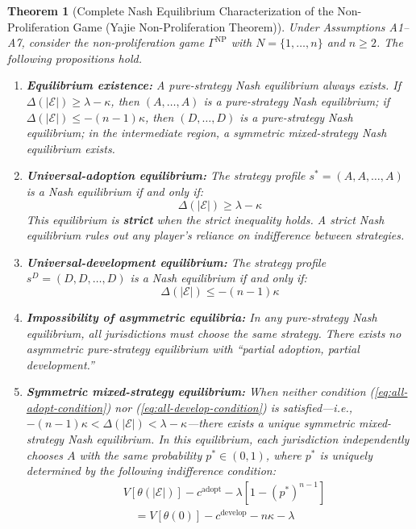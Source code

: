 \documentclass[12pt,a4paper]{article}
\newtheorem{theorem}{Theorem}[section]
\theoremstyle{definition}
\theoremstyle{remark}
\begin{document}
\begin{theorem}[Complete Nash Equilibrium Characterization of the Non-Proliferation Game (Yajie Non-Proliferation Theorem)]
\label{thm:npe-complete}
Under Assumptions A1--A7, consider the non-proliferation game $\Gamma^{\text{NP}}$ with $N = \{1, \ldots, n\}$ and $n \geq 2$. The following propositions hold.

\begin{enumerate}[label=(\roman*), itemsep=6pt]
\item \textbf{Equilibrium existence:} A pure-strategy Nash equilibrium always exists. If $\Delta(|\mathcal{E}|) \geq \lambda - \kappa$, then $(A, \ldots, A)$ is a pure-strategy Nash equilibrium; if $\Delta(|\mathcal{E}|) \leq -(n-1)\kappa$, then $(D, \ldots, D)$ is a pure-strategy Nash equilibrium; in the intermediate region, a symmetric mixed-strategy Nash equilibrium exists.\label{item:existence}

\item \textbf{Universal-adoption equilibrium:} The strategy profile $s^* = (A, A, \ldots, A)$ is a Nash equilibrium if and only if:
\begin{equation}
\boxed{\Delta(|\mathcal{E}|) \geq \lambda - \kappa}
\label{eq:all-adopt-condition}
\end{equation}
This equilibrium is \textbf{strict} when the strict inequality holds. A strict Nash equilibrium rules out any player's reliance on indifference between strategies.\label{item:all-adopt}

\item \textbf{Universal-development equilibrium:} The strategy profile $s^{D} = (D, D, \ldots, D)$ is a Nash equilibrium if and only if:
\begin{equation}
\boxed{\Delta(|\mathcal{E}|) \leq -(n-1)\kappa}
\label{eq:all-develop-condition}
\end{equation}
\label{item:all-develop}

\item \textbf{Impossibility of asymmetric equilibria:} In any pure-strategy Nash equilibrium, all jurisdictions must choose the same strategy. There exists no asymmetric pure-strategy equilibrium with ``partial adoption, partial development.''\label{item:no-asym}

\item \textbf{Symmetric mixed-strategy equilibrium:} When neither condition (\ref{eq:all-adopt-condition}) nor (\ref{eq:all-develop-condition}) is satisfied—i.e., $-(n-1)\kappa < \Delta(|\mathcal{E}|) < \lambda - \kappa$—there exists a unique symmetric mixed-strategy Nash equilibrium. In this equilibrium, each jurisdiction independently chooses $A$ with the same probability $p^* \in (0,1)$, where $p^*$ is uniquely determined by the following indifference condition:
\begin{align}
&V[\theta(|\mathcal{E}|)] - c^{\text{adopt}} - \lambda\left[1 - (p^*)^{n-1}\right] \nonumber\\
&\quad = V[\theta(0)] - c^{\text{develop}} - n\kappa - \lambda
\label{eq:indifference}
\end{align}
\end{enumerate}
\end{theorem}
\end{document}
